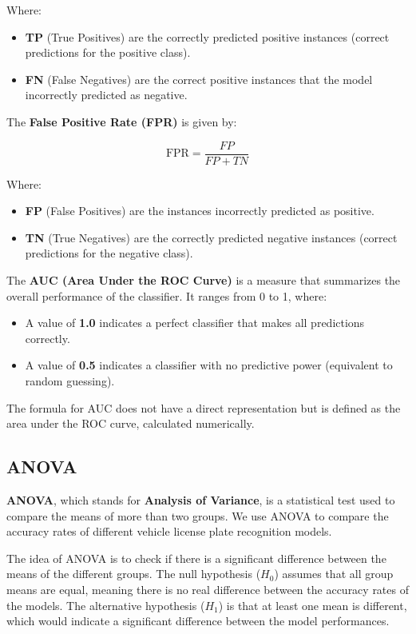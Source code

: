 \documentclass[conference]{IEEEtran}
\begin{document}
	Where:
	
	\begin{itemize}
		\item \textbf{TP} (True Positives) are the correctly predicted positive instances (correct predictions for the positive class).
		\item \textbf{FN} (False Negatives) are the correct positive instances that the model incorrectly predicted as negative.
	\end{itemize}
	
	The \textbf{False Positive Rate (FPR)} is given by:
	
	\[
	\text{FPR} = \frac{FP}{FP + TN}
	\]
	
	Where:
	
	\begin{itemize}
		\item \textbf{FP} (False Positives) are the instances incorrectly predicted as positive.
		\item \textbf{TN} (True Negatives) are the correctly predicted negative instances (correct predictions for the negative class).
	\end{itemize}
	
	The \textbf{AUC (Area Under the ROC Curve)} is a measure that summarizes the overall performance of the classifier. It ranges from 0 to 1, where:
	
	\begin{itemize}
		\item A value of \textbf{1.0} indicates a perfect classifier that makes all predictions correctly.
		\item A value of \textbf{0.5} indicates a classifier with no predictive power (equivalent to random guessing).
	\end{itemize}
	
	The formula for AUC does not have a direct representation but is defined as the area under the ROC curve, calculated numerically.
	
	\subsection{ANOVA}
	
	\textbf{ANOVA}, which stands for \textbf{Analysis of Variance}, is a statistical test used to compare the means of more than two groups. We use ANOVA to compare the accuracy rates of different vehicle license plate recognition models.
	
	The idea of ANOVA is to check if there is a significant difference between the means of the different groups. The null hypothesis ($H_0$) assumes that all group means are equal, meaning there is no real difference between the accuracy rates of the models. The alternative hypothesis ($H_1$) is that at least one mean is different, which would indicate a significant difference between the model performances.
	
\end{document}

